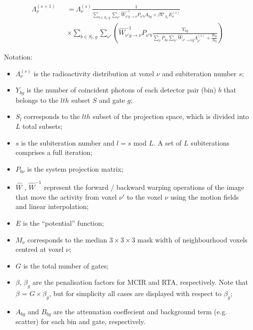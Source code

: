 \documentclass{article}
\begin{document}
\begin{equation}
\begin{array}{lcl}
\Lambda_{\nu}^{(s+1)}&&=\Lambda_{\nu}^{(s)} \frac{1}{ \sum\limits_{b\in S_{l}, g} \sum\limits_{\nu'} \hat{W}^{-1} _{\nu'g\rightarrow \nu}P_{\nu' b}A_{bg}+\beta \nabla_{\Lambda_{\nu}} E_{\nu}^{(s)}}\\
&&\times \sum\limits_{b\in S_{l}, g} \sum\limits_{\nu'}\left(\hat{W}^{-1} _{\nu'g\rightarrow \nu}P_{\nu' b}\frac{Y_{bg}}{\sum\limits_{\tilde{\nu}}P_{b\tilde{\nu}}\sum\limits_{\tilde{\nu}'}\hat{W} _{\tilde{\nu}'\rightarrow \tilde{\nu}g}\Lambda_{\tilde{\nu}'}^{(s)}+\frac{B_{bg}}{A_{bg}}}\right)
\end{array}
\end{equation}



Notation: 
\begin{itemize}
\item $\Lambda_{\nu}^{(s)}$ is the radioactivity distribution at voxel ${\nu}$ and subiteration number $s$;

\item $Y_{bg}$ is the number of coincident photons of each detector pair (bin) $b$ that belongs to the $lth$ subset $S$ and gate $g$;

\item $S_{l}$ corresponds to the $lth$ subset of the projection space, which is divided into $L$ total subsets;

\item $s$ is the subiteration number and $l = s$ mod $L$. A set of $L$ subiterations comprises a full iteration;

\item $P_{b\nu}$ is the system projection matrix;

\item $\hat{W}$ , $\hat{W}^{-1}$ represent the forward / backward warping operations of the image that move the activity from voxel $\nu'$ to the voxel $\nu$ using the motion fields and linear interpolation;

\item $E$ is the ``potential'' function;

\item $M_{\nu}$ corresponds to the median $3\times3\times3$ mask width of neighbourhood voxels centred at voxel $\nu$;

\item $G$ is the total number of gates;

\item $\beta$, $\beta_{g}$ are the penalisation factors for MCIR and RTA, respectively. Note that $\beta$ = $G\times\beta_{g}$, but for simplicity all cases are displayed with respect to $\beta_{g}$;

\item $A_{bg}$ and $B_{bg}$ are the attenuation coeffecient and background term (e.g. scatter) for each bin and gate, respectively.
\end{itemize}
\end{document}
